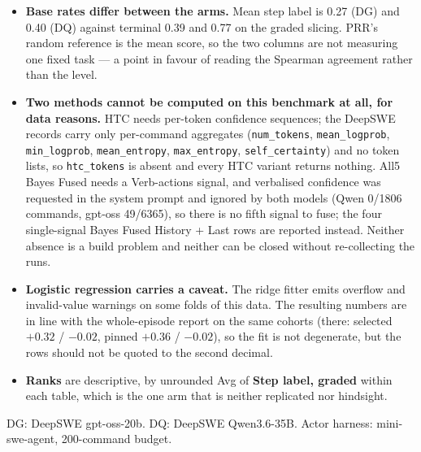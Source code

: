 \documentclass[10pt,a4paper]{article}
\begin{document}
\begin{itemize}
\item \textbf{Base rates differ between the arms.} Mean step label is 0.27 (DG) and 0.40 (DQ) against terminal 0.39 and 0.77 on the graded slicing. PRR's random reference is the mean score, so the two columns are not measuring one fixed task --- a point in favour of reading the Spearman agreement rather than the level.
\item \textbf{Two methods cannot be computed on this benchmark at all, for data reasons.} HTC needs per-token confidence sequences; the DeepSWE records carry only per-command aggregates (\texttt{num\_tokens}, \texttt{mean\_logprob}, \texttt{min\_logprob}, \texttt{mean\_entropy}, \texttt{max\_entropy}, \texttt{self\_certainty}) and no token lists, so \texttt{htc\_tokens} is absent and every HTC variant returns nothing. All5 Bayes Fused needs a Verb-actions signal, and verbalised confidence was requested in the system prompt and ignored by both models (Qwen 0/1806 commands, gpt-oss 49/6365), so there is no fifth signal to fuse; the four single-signal Bayes Fused History + Last rows are reported instead. Neither absence is a build problem and neither can be closed without re-collecting the runs.
\item \textbf{Logistic regression carries a caveat.} The ridge fitter emits overflow and invalid-value warnings on some folds of this data. The resulting numbers are in line with the whole-episode report on the same cohorts (there: selected $+0.32$ / $-0.02$, pinned $+0.36$ / $-0.02$), so the fit is not degenerate, but the rows should not be quoted to the second decimal.
\item \textbf{Ranks} are descriptive, by unrounded Avg of \textbf{Step label, graded} within each table, which is the one arm that is neither replicated nor hindsight.
\end{itemize}
{\small DG: DeepSWE gpt-oss-20b. DQ: DeepSWE Qwen3.6-35B. Actor harness: mini-swe-agent, 200-command budget.\par}

\Needspace{45mm}
\end{document}
